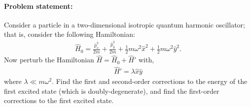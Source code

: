 \documentclass[10pt]{article}
\newcommand{\1}{\mathbf 1}
\begin{document}






\paragraph{Problem statement:}
Consider a particle in a two-dimensional isotropic quantum harmonic oscillator; that is, consider the following Hamiltonian:
\begin{align}
	\hat H_0
	=
	\frac{\hat p_x^2}{2m}
	+
	\frac{\hat p_y^2}{2m}
	+
	\frac{1}{2} m \omega^2 \hat x^2
	+
	\frac{1}{2} m \omega^2 \hat y^2.
\end{align}
Now perturb the Hamiltonian $\hat H = \hat H_0 + \hat H'$ with,
\begin{align}
	\hat H' = \lambda \hat x \hat y
\end{align}
where $\lambda \ll m \omega^2$.
Find the first and second-order corrections to the energy of the first excited state (which is doubly-degenerate), and find the first-order corrections to the first excited state.
\end{document}
